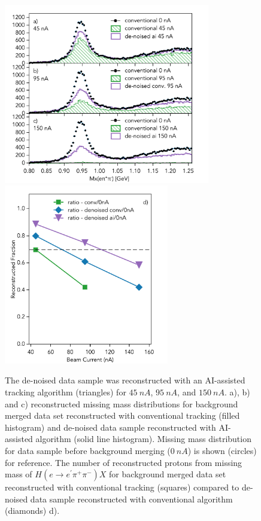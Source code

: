 \begin{figure}[!h]
\begin{center}
 \includegraphics[height=3.1in]{images/plots_mxepipi_dn_ai_ns.pdf}
 \includegraphics[height=3.1in]{images/graph_mxepipi_dn_ai_ns.pdf}
\caption { 
The de-noised data sample was reconstructed with an AI-assisted tracking 
algorithm (triangles)  for $45~nA$, $95~nA$, and $150~nA$. a), b) and c) reconstructed missing mass distributions for 
background merged data set reconstructed with conventional tracking (filled histogram) and de-noised data sample 
reconstructed with AI-assisted algorithm (solid line histogram). Missing mass distribution for data sample before 
background merging ($0~nA$) is shown (circles) for reference.
The number of reconstructed protons from missing mass of $H(e \rightarrow e^\prime \pi^+ \pi^-) X$ 
for background merged data set reconstructed with conventional tracking (squares) compared to de-noised data sample 
reconstructed with conventional algorithm (diamonds) d). }

 \label{physics::conv_dn_ai}
 \end{center}
\end{figure}

